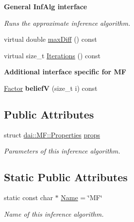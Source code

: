 \begin{Indent}{\bf General InfAlg interface}
\begin{CompactItemize}
\begin{CompactList}\small\item\em Runs the approximate inference algorithm. \item\end{CompactList}\item 
virtual double \hyperlink{classdai_1_1MF_032b149026f011a5cbcd01eb08a3b8dc}{maxDiff} () const 
\item 
virtual size\_\-t \hyperlink{classdai_1_1MF_e2daf3cd007572d19d6156f2484db4fd}{Iterations} () const 
\end{CompactItemize}
\end{Indent}
\begin{Indent}{\bf Additional interface specific for MF}\par
\begin{CompactItemize}
\item 
\hypertarget{classdai_1_1MF_b5f9fa5f11b2ec4377db1d1c1360cf86}{
\hyperlink{classdai_1_1TFactor}{Factor} \textbf{beliefV} (size\_\-t i) const }
\label{classdai_1_1MF_b5f9fa5f11b2ec4377db1d1c1360cf86}

\end{CompactItemize}
\end{Indent}
\subsection*{Public Attributes}
\begin{CompactItemize}
\item 
\hypertarget{classdai_1_1MF_7fe9b554132a55d416199fcea7da014c}{
struct \hyperlink{structdai_1_1MF_1_1Properties}{dai::MF::Properties} \hyperlink{classdai_1_1MF_7fe9b554132a55d416199fcea7da014c}{props}}
\label{classdai_1_1MF_7fe9b554132a55d416199fcea7da014c}

\begin{CompactList}\small\item\em Parameters of this inference algorithm. \item\end{CompactList}\end{CompactItemize}
\subsection*{Static Public Attributes}
\begin{CompactItemize}
\item 
\hypertarget{classdai_1_1MF_ad41c263042fe7c780d404b4b32574f8}{
static const char $\ast$ \hyperlink{classdai_1_1MF_ad41c263042fe7c780d404b4b32574f8}{Name} = \char`\"{}MF\char`\"{}}
\label{classdai_1_1MF_ad41c263042fe7c780d404b4b32574f8}

\begin{CompactList}\small\item\em Name of this inference algorithm. \item\end{CompactList}\end{CompactItemize}
